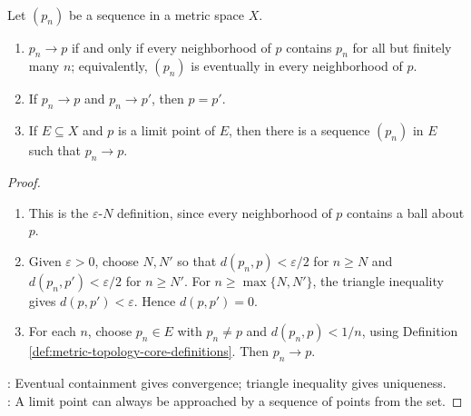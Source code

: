 \begin{theorem} \label{thm:metric-sequence-basic-properties} \\
Let $(p_n)$ be a sequence in a metric space $X$.
\begin{enumerate}[label=(\roman*)]
\setlength{\itemsep}{0pt}
\item $p_n\to p$ if and only if every neighborhood of $p$ contains $p_n$ for all but finitely many $n$; equivalently, $(p_n)$ is eventually in every neighborhood of $p$.
\item If $p_n\to p$ and $p_n\to p'$, then $p=p'$.
\item If $E\subseteq X$ and $p$ is a limit point of $E$, then there is a sequence $(p_n)$ in $E$ such that $p_n\to p$.
\end{enumerate}
\begin{proof}
\begin{enumerate}[label=(\roman*)]
\setlength{\itemsep}{0pt}
\item This is the $\varepsilon$-$N$ definition, since every neighborhood of $p$ contains a ball about $p$.
\item Given $\varepsilon>0$, choose $N,N'$ so that $d(p_n,p)<\varepsilon/2$ for $n\geq N$ and $d(p_n,p')<\varepsilon/2$ for $n\geq N'$. For $n\geq\max\{N,N'\}$, the triangle inequality gives $d(p,p')<\varepsilon$. Hence $d(p,p')=0$.
\item For each $n$, choose $p_n\in E$ with $p_n\neq p$ and $d(p_n,p)<1/n$, using Definition \ref{def:metric-topology-core-definitions}. Then $p_n\to p$.
\end{enumerate}
: Eventual containment gives convergence; triangle inequality gives uniqueness.\\
: A limit point can always be approached by a sequence of points from the set.
\end{proof}
\end{theorem}


